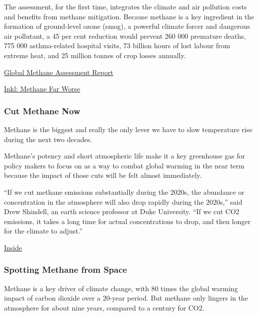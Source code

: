 \documentclass[
]{book}
\begin{document}
The assessment, for the first time, integrates the climate and air pollution costs and benefits from methane mitigation. Because methane is a key ingredient in the formation of ground-level ozone (smog), a powerful climate forcer and dangerous air pollutant, a 45 per cent reduction would prevent 260 000 premature deaths, 775 000 asthma-related hospital visits, 73 billion hours of lost labour from extreme heat, and 25 million tonnes of crop losses annually.

\href{https://www.ccacoalition.org/en/resources/global-methane-assessment-full-report}{Global Methane Assessment Report}

\href{https://www.inkl.com/news/a-sweeping-u-n-report-says-methane-is-far-worse-for-the-climate-human-health-than-previously-thought}{Inkl: Methane Far Worse}

\hypertarget{cut-methane-now}{%
\subsubsection{Cut Methane Now}\label{cut-methane-now}}

Methane is the biggest and really the only lever we have to slow
temperature rise during the next two decades.

Methane's potency and short atmospheric life make it a key greenhouse gas for policy makers to focus on as a way to combat global warming in the near term because the impact of those cuts will be felt almost immediately.

``If we cut methane emissions substantially during the 2020s, the abundance or concentration in the atmosphere will also drop rapidly during the 2020s,'' said Drew Shindell, an earth science professor at Duke University. ``If we cut CO2 emissions, it takes a long time for actual concentrations to drop, and then longer for the climate to adjust.''

\href{https://insideclimatenews.org/news/20042021/methane-biden-climate-summit/}{Inside}

\hypertarget{spotting-methane-from-space}{%
\subsubsection{Spotting Methane from Space}\label{spotting-methane-from-space}}

Methane is a key driver of climate change, with 80 times the global warming impact of carbon dioxide over a 20-year period. But methane only lingers in the atmosphere for about nine years, compared to a century for CO2.
\end{document}
